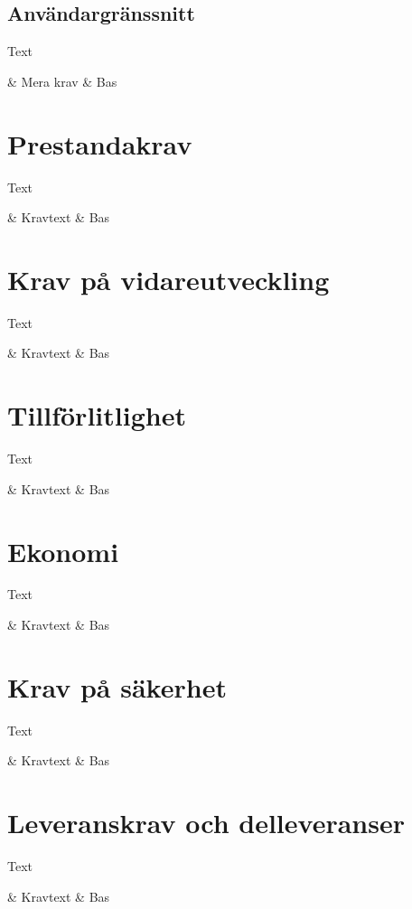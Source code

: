 \documentclass[10pt,oneside,swedish]{lips}
\begin{document}
\subsection{Användargränssnitt}
Text
\begin{requirements}
  \requirementno & Mera krav & Bas\\
\end{requirements}

\section{Prestandakrav}
Text
\begin{requirements}
  \requirementno & Kravtext & Bas\\
\end{requirements}

\section{Krav på vidareutveckling}
Text
\begin{requirements}
  \requirementno & Kravtext & Bas\\
\end{requirements}

\section{Tillförlitlighet}
Text
\begin{requirements}
  \requirementno & Kravtext & Bas\\
\end{requirements}

\section{Ekonomi} 
Text
\begin{requirements}
  \requirementno & Kravtext & Bas\\
\end{requirements}

\section{Krav på säkerhet}
Text
\begin{requirements}
  \requirementno & Kravtext & Bas\\
\end{requirements}

\section{Leveranskrav och delleveranser} 
Text
\begin{requirements}
  \requirementno & Kravtext & Bas\\
\end{requirements}
\end{document}
